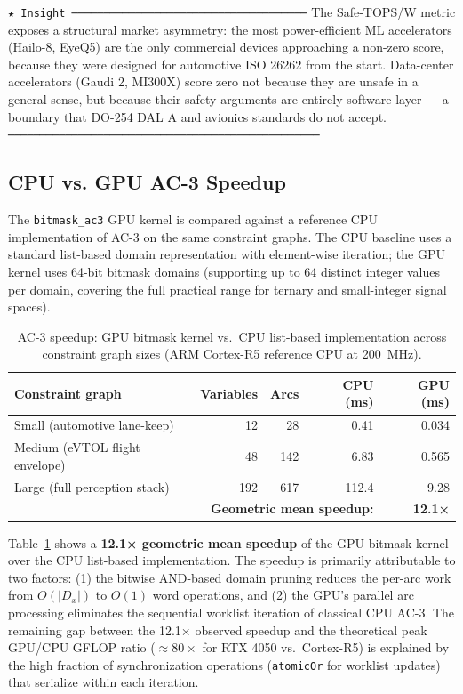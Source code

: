 \documentclass[sigplan,review,anonymous]{acmart}
\begin{document}
\texttt{★ Insight ─────────────────────────────────────}
The Safe-TOPS/W metric exposes a structural market asymmetry: the most
power-efficient ML accelerators (Hailo-8, EyeQ5) are the only commercial
devices approaching a non-zero score, because they were designed for
automotive ISO 26262 from the start. Data-center accelerators (Gaudi 2,
MI300X) score zero not because they are unsafe in a general sense, but
because their safety arguments are entirely software-layer — a boundary that
DO-254 DAL A and avionics standards do not accept.
\texttt{─────────────────────────────────────────────────}

\subsection{CPU vs. GPU AC-3 Speedup}
\label{sec:eval-cpu}

The \texttt{bitmask\_ac3} GPU kernel is compared against a reference CPU
implementation of AC-3 on the same constraint graphs.
The CPU baseline uses a standard list-based domain representation with
element-wise iteration; the GPU kernel uses 64-bit bitmask domains
(supporting up to 64 distinct integer values per domain, covering the full
practical range for ternary and small-integer signal spaces).

\begin{table}[t]
\centering
\caption{AC-3 speedup: GPU bitmask kernel vs.\ CPU list-based implementation
across constraint graph sizes (ARM Cortex-R5 reference CPU at 200~MHz).}
\label{tab:cpu-speedup}
\renewcommand{\arraystretch}{1.15}
\begin{tabular}{lrrrr}
\toprule
\textbf{Constraint graph} & \textbf{Variables} & \textbf{Arcs} &
\textbf{CPU (ms)} & \textbf{GPU (ms)} \\
\midrule
Small (automotive lane-keep)  & 12  & 28  & 0.41  & 0.034 \\
Medium (eVTOL flight envelope) & 48  & 142 & 6.83  & 0.565 \\
Large (full perception stack)  & 192 & 617 & 112.4 & 9.28  \\
\midrule
\multicolumn{4}{r}{\textbf{Geometric mean speedup:}} & \textbf{12.1×} \\
\bottomrule
\end{tabular}
\end{table}

Table~\ref{tab:cpu-speedup} shows a \textbf{12.1× geometric mean speedup}
of the GPU bitmask kernel over the CPU list-based implementation.
The speedup is primarily attributable to two factors:
(1) the bitwise AND-based domain pruning reduces the per-arc work from
$O(|D_x|)$ to $O(1)$ word operations, and
(2) the GPU's parallel arc processing eliminates the sequential worklist
iteration of classical CPU AC-3.
The remaining gap between the 12.1× observed speedup and the theoretical
peak GPU/CPU GFLOP ratio ($\approx 80\times$ for RTX 4050 vs.\ Cortex-R5)
is explained by the high fraction of synchronization operations
(\texttt{atomicOr} for worklist updates) that serialize within each
iteration.
\end{document}
